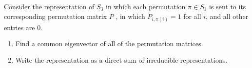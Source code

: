 \documentclass[12pt]{memoir}
\begin{document}
\begin{Ej}
    Consider the representation of $S_3$ in which each permutation $\pi\in S_3$ is sent to its corresponding permutation matrix $P$ , in which $P_{i,\pi(i)}=1$ for all $i$, and all other entries are $0$.
    \begin{enumerate}
        \item Find a common eigenvector of all of the permutation matrices.
        \item Write the representation as a direct sum of irreducible representations.
    \end{enumerate}
\end{Ej}
\end{document}
